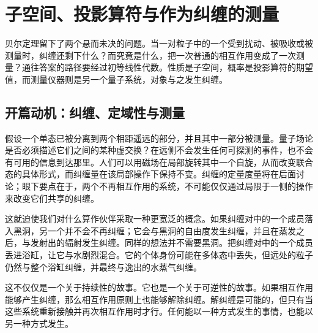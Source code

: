 \chapter{子空间、投影算符与作为纠缠的测量}

贝尔定理留下了两个悬而未决的问题。当一对粒子中的一个受到扰动、被吸收或被测量时，纠缠还剩下什么？而究竟是什么，把一次普通的相互作用变成了一次测量？通往答案的路径要经过初等线性代数。性质是子空间，概率是投影算符的期望值，而测量仪器则是另一个量子系统，对象与之发生纠缠。

\section{开篇动机：纠缠、定域性与测量}

假设一个单态已被分离到两个相距遥远的部分，并且其中一部分被测量。量子场论是否必须描述它们之间的某种虚交换？在远侧不会发生任何可探测的事件，也不会有可用的信息到达那里。人们可以用磁场在局部旋转其中一个自旋，从而改变联合态的具体形式，而纠缠量在该局部操作下保持不变。纠缠的定量度量将在后面讨论；眼下要点在于，两个不再相互作用的系统，不可能仅仅通过局限于一侧的操作来改变它们共享的纠缠。

\begin{classroomqa}
\end{classroomqa}

这就迫使我们对什么算作伙伴采取一种更宽泛的概念。如果纠缠对中的一个成员落入黑洞，另一个并不会不再纠缠；它会与黑洞的自由度发生纠缠，并且在蒸发之后，与发射出的辐射发生纠缠。同样的想法并不需要黑洞。把纠缠对中的一个成员丢进浴缸，让它与水剧烈混合。它的个体身份可能在多体态中丢失，但远处的粒子仍然与整个浴缸纠缠，并最终与逸出的水蒸气纠缠。

这不仅仅是一个关于持续性的故事。它也是一个关于可逆性的故事。如果相互作用能够产生纠缠，那么相互作用原则上也能够解除纠缠。解纠缠是可能的，但只有当这些系统重新接触并再次相互作用时才行。任何能以一种方式发生的事情，也能以另一种方式发生。

\begin{classroomqa}
\end{classroomqa}

